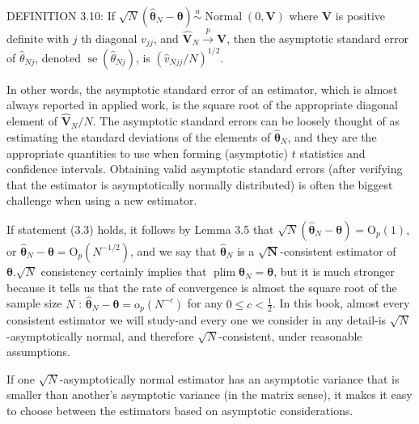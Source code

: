 \documentclass[10pt]{article}
\begin{document}
DEFINITION 3.10: If $\sqrt{N}\left(\hat{\boldsymbol{\theta}}_{N}-\boldsymbol{\theta}\right) \stackrel{a}{\sim} \operatorname{Normal}(0, \mathbf{V})$ where $\mathbf{V}$ is positive definite with $j$ th diagonal $v_{j j}$, and $\hat{\mathbf{V}}_{N} \xrightarrow{p} \mathbf{V}$, then the asymptotic standard error of $\hat{\theta}_{N j}$, denoted $\operatorname{se}\left(\hat{\theta}_{N j}\right)$, is $\left(\hat{v}_{N j j} / N\right)^{1 / 2}$.

In other words, the asymptotic standard error of an estimator, which is almost always reported in applied work, is the square root of the appropriate diagonal element of $\hat{\mathbf{V}}_{N} / N$. The asymptotic standard errors can be loosely thought of as estimating the standard deviations of the elements of $\hat{\boldsymbol{\theta}}_{N}$, and they are the appropriate quantities to use when forming (asymptotic) $t$ statistics and confidence intervals. Obtaining valid asymptotic standard errors (after verifying that the estimator is asymptotically normally distributed) is often the biggest challenge when using a new estimator.

If statement (3.3) holds, it follows by Lemma 3.5 that $\sqrt{N}\left(\hat{\boldsymbol{\theta}}_{N}-\boldsymbol{\theta}\right)=\mathrm{O}_{p}(1)$, or $\hat{\boldsymbol{\theta}}_{N}-\boldsymbol{\theta}=\mathrm{O}_{p}\left(N^{-1 / 2}\right)$, and we say that $\hat{\boldsymbol{\theta}}_{N}$ is a $\sqrt{\mathbf{N}}$-consistent estimator of $\boldsymbol{\theta} . \sqrt{N}$ consistency certainly implies that $\operatorname{plim} \hat{\boldsymbol{\theta}}_{N}=\boldsymbol{\theta}$, but it is much stronger because it tells us that the rate of convergence is almost the square root of the sample size $N$ : $\hat{\boldsymbol{\theta}}_{N}-\boldsymbol{\theta}=\mathrm{o}_{p}\left(N^{-c}\right)$ for any $0 \leq c<\frac{1}{2}$. In this book, almost every consistent estimator we will study-and every one we consider in any detail-is $\sqrt{N}$-asymptotically normal, and therefore $\sqrt{N}$-consistent, under reasonable assumptions.

If one $\sqrt{N}$-asymptotically normal estimator has an asymptotic variance that is smaller than another's asymptotic variance (in the matrix sense), it makes it easy to choose between the estimators based on asymptotic considerations.
\end{document}
